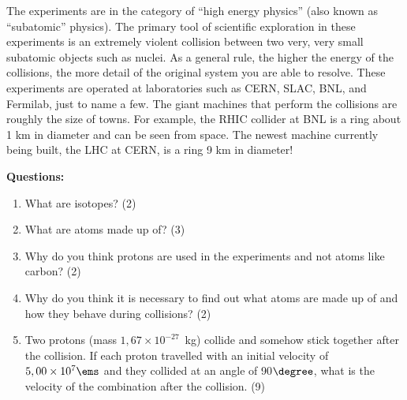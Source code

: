 {The experiments are in the category of ``high energy physics'' (also known
as ``subatomic'' physics). The primary tool of scientific exploration in
these experiments is an extremely violent collision between two very, very
small subatomic objects such as nuclei. As a general rule, the higher the
energy of the collisions, the more detail of the original system you are
able to resolve. These experiments are operated at laboratories such as
CERN, SLAC, BNL, and Fermilab, just to name a few. The giant machines that
perform the collisions are roughly the size of towns. For example, the RHIC
collider at BNL is a ring about 1 km in diameter and can be seen from space.
The newest machine currently being built, the LHC at CERN, is a ring 9 km in
diameter!}

{\textbf{Questions:}
\begin{enumerate}
\item{What are isotopes?  (2)}
\item{What are atoms made up of?  (3)}
\item{Why do you think protons are used in the experiments and not atoms like carbon?  (2)}
\item {Why do you think it is necessary to find out what atoms are made up of and how they behave during collisions?  (2)}
\item{Two protons (mass $1,67\times 10^{-27}$~kg) collide and somehow stick together after the collision. If each proton travelled with an initial velocity of $5,00\times 10^{7}\ems$ and they collided at an angle of 90$\degree$, what is the velocity of the combination after the collision.   (9)}
\end{enumerate}




}
